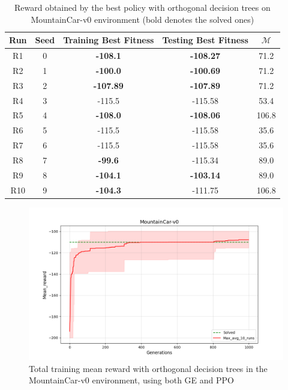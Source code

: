 \begin{table}[h!]
\begin{center}
\begin{tabular}{ |c|c|c|c|c| } 
\hline
\textbf{Run} & \textbf{Seed} & \textbf{Training Best Fitness} & \textbf{Testing Best Fitness} & $\mathcal{M}$\\
\hline
R1 & 0 & \textbf{-108.1} & \textbf{-108.27} & 71.2\\
R2 & 1 & \textbf{-100.0} & \textbf{-100.69} & 71.2\\
R3 & 2 & \textbf{-107.89} & \textbf{-107.89} & 71.2\\
R4 & 3 & -115.5 & -115.58 & 53.4\\
R5 & 4 & \textbf{-108.0} & \textbf{-108.06} & 106.8\\
R6 & 5 & -115.5 & -115.58 & 35.6\\
R7 & 6 & -115.5 & -115.58 & 35.6\\
R8 & 7 & \textbf{-99.6} & -115.34 & 89.0\\
R9 & 8 & \textbf{-104.1} & \textbf{-103.14} & 89.0\\
R10 & 9 & \textbf{-104.3} & -111.75 & 106.8\\
\hline
\end{tabular}
\caption{Reward obtained by the best policy with orthogonal decision trees on MountainCar-v0 environment (bold denotes the solved ones)}
\label{table:scoreMC}
\end{center}
\end{table}


\begin{figure}[h!]
    \centering
    \includegraphics[width=1\linewidth]{images/MountainCar/MountainCar10run.png}
    \caption{Total training mean reward with orthogonal decision trees in the MountainCar-v0 environment, using both GE and PPO}
    \label{fig:MountainCarMean}
\end{figure}

